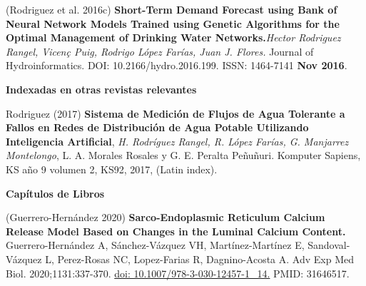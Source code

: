 \documentclass[10pt]{article}
\newenvironment{innerlist}[1][\enskip\textbullet]%
        {\begin{compactitem}[#1]}{\end{compactitem}}
\newcommand{\blankline}{\quad\pagebreak[2]}
\begin{document}
\begin{innerlist}
\item (Rodriguez et al. 2016c) \textbf{Short-Term Demand Forecast using Bank of Neural Network Models Trained using Genetic Algorithms for the Optimal Management of Drinking Water Networks.}\textit{Hector Rodriguez Rangel, Vicen\c{c} Puig, Rodrigo López Farías, Juan J. Flores.}  {Journal of Hydroinformatics}. DOI: 10.2166/hydro.2016.199. ISSN: 1464-7141 \textbf{Nov 2016}.
\end{innerlist}



\blankline

\textbf{Indexadas en otras revistas relevantes }
\begin{innerlist}
\item Rodriguez (2017) \textbf{Sistema de Medición de Flujos de Agua Tolerante a Fallos en Redes de Distribución de Agua Potable Utilizando Inteligencia Artificial}, \textit{H. Rodríguez Rangel, R. López Farías, G. Manjarrez Montelongo}, L. A. Morales Rosales y G. E. Peralta Peñuñuri. Komputer Sapiens, KS año 9 volumen 2, KS92, 2017, (Latin index).
\end{innerlist}
\blankline

\textbf{Capítulos de Libros}

\begin{innerlist}
\item (Guerrero-Hernández 2020) \textbf{Sarco-Endoplasmic Reticulum Calcium Release Model Based on Changes in the Luminal Calcium Content.} Guerrero-Hernández A, Sánchez-Vázquez VH, Martínez-Martínez E, Sandoval-Vázquez L, Perez-Rosas NC, Lopez-Farias R, Dagnino-Acosta A.  Adv Exp Med Biol. 2020;1131:337-370. \url{doi: 10.1007/978-3-030-12457-1_14.} PMID: 31646517.


\end{innerlist}
\end{document}
